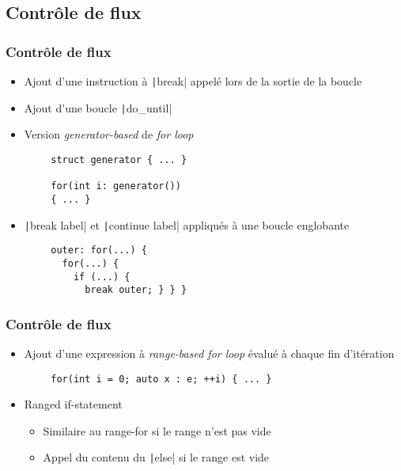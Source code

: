 \documentclass[C++.tex]{subfiles}
\begin{document}
\subsection*{Contrôle de flux}
\begin{frame}[fragile]
	\frametitle{Contrôle de flux}
	\begin{itemize}
		\item Ajout d'une instruction à \texttt|break| appelé lors de la sortie de la boucle


		\item Ajout d'une boucle \texttt|do_until|
		\item Version \textit{generator-based} de \textit{for loop}
	\end{itemize}

	\begin{verbatim}
		struct generator { ... }

		for(int i: generator())
		{ ... }
	\end{verbatim}

	\begin{itemize}
		\item \texttt|break label| et \texttt|continue label| appliqués à une boucle englobante
	\end{itemize}

	\begin{verbatim}
		outer: for(...) {
		  for(...) {
		    if (...) {
		      break outer; } } }
	\end{verbatim}

\end{frame}

\begin{frame}[fragile]
	\frametitle{Contrôle de flux}
	\begin{itemize}
		\item Ajout d'une expression à \textit{range-based for loop} évalué à chaque fin d'itération
	\end{itemize}

	\begin{verbatim}
		for(int i = 0; auto x : e; ++i) { ... }
	\end{verbatim}

	\begin{itemize}
		\item Ranged if-statement
		\begin{itemize}
			\item Similaire au range-for si le range n'est pas vide
			\item Appel du contenu du \texttt|else| si le range est vide
		\end{itemize}
	\end{itemize}

\end{frame}
\end{document}
